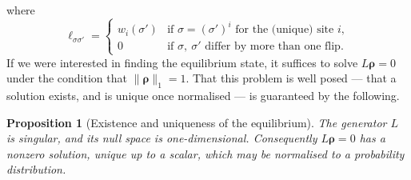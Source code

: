 \documentclass[12pt]{article}
\newcommand{\brho}{\boldsymbol{\rho}}
\newtheorem{proposition}[theorem]{Proposition}
\theoremstyle{definition}
\theoremstyle{remark}
\begin{document}
where 
\[
\ell_{\sigma \sigma'} =
\begin{cases}
w_i(\sigma') & \text{if } \sigma = (\sigma')^i \text{ for the (unique) site } i, \\[4pt]
0 & \text{if } \sigma,\ \sigma' \text{ differ by more than one flip.}
\end{cases}
\]
If we were interested in finding the equilibrium state, it suffices to solve $L \brho = 0$ under the condition that $\|\brho\|_1  = 1$. That this problem is well posed --- that a solution exists, and is unique once normalised --- is guaranteed by the following.

\begin{proposition}[Existence and uniqueness of the equilibrium]\label{prop:singular}
The generator $L$ is singular, and its null space is one-dimensional. Consequently $L\brho = 0$ has a nonzero solution, unique up to a scalar, which may be normalised to a probability distribution.
\end{proposition}
\end{document}
